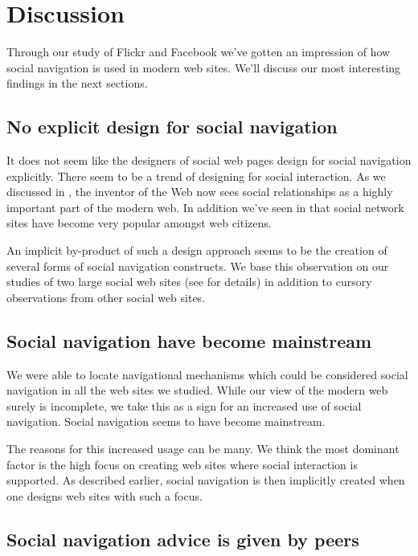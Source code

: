 \section{Discussion}

Through our study of Flickr and Facebook we've gotten an impression of how
social navigation is used in modern web sites. We'll discuss our most
interesting findings in the next sections.

\subsection{No explicit design for social navigation}

It does not seem like the designers of social web pages design for social
navigation explicitly. There seem to be a trend of designing for social
interaction. As we discussed in
, the inventor of the Web
now sees social relationships as a highly important part of the modern web.
In addition we've seen in
that social network sites have become very popular amongst web citizens.

An implicit by-product of such a design approach seems to be
the creation of several forms of social navigation constructs.
We base this observation on our studies of two large social web sites
(see  for details)
in addition to cursory observations from other social web sites.

\subsection{Social navigation have become mainstream}

We were able to locate navigational mechanisms which could be considered
social navigation in all the web sites we studied. While our view of the
modern web surely is incomplete, we take this as a sign for an increased use
of social navigation. Social navigation seems to have become mainstream.

The reasons for this increased usage can be many. We think the most dominant
factor is the high focus on creating web sites where social interaction is
supported. As described earlier, social navigation is then implicitly created
when one designs web sites with such a focus.

\subsection{Social navigation advice is given by peers}

